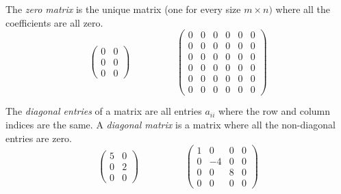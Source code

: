 \documentclass[fleqn]{report}
\begin{document}
\begin{defn}
The \emph{zero matrix} is the unique matrix (one for every size $m
\times n)$ where all the coefficients are all zero. 
\begin{displaymath}
\left(
\begin{matrix}
0 & 0 \\
0 & 0 \\
0 & 0 
\end{matrix}
\right)
\hspace{2cm}
\left(
\begin{matrix}
0 & 0 & 0 & 0 & 0 & 0 \\
0 & 0 & 0 & 0 & 0 & 0 \\
0 & 0 & 0 & 0 & 0 & 0 \\
0 & 0 & 0 & 0 & 0 & 0 \\
0 & 0 & 0 & 0 & 0 & 0 \\
0 & 0 & 0 & 0 & 0 & 0 
\end{matrix}
\right)
\end{displaymath}
\end{defn}

\begin{defn}
The \emph{diagonal entries} of a matrix are all entries $a_{ii}$
where the row and column indices are the same. A \emph{diagonal
matrix} is a matrix where all the non-diagonal entries are zero.
\begin{displaymath}
\left(
\begin{matrix}
5 & 0 \\
0 & 2 \\
0 & 0 
\end{matrix}
\right)
\hspace{2cm}
\left(
\begin{matrix}
1 & 0 & 0 & 0 \\
0 & -4 & 0 & 0 \\
0 & 0 & 8 & 0 \\
0 & 0 & 0 & 0 
\end{matrix}
\right)
\end{displaymath}
\end{defn}
\end{document}
